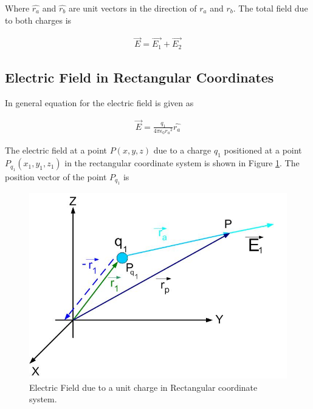 \documentclass{ximera}
\begin{document}
Where $\hat{r_a}$ and $\hat{r_b}$ are unit vectors in the direction of $r_a$ and $r_b$. The total field due to both charges is


\begin{eqnarray}
\vec{E}=\vec{E_1} + \vec{E_2} 
\end{eqnarray}






\subsection{Electric Field in Rectangular Coordinates}


In general equation for the electric field is given as



\begin{eqnarray}
\vec{E}=\frac{q_1}{4 \pi \epsilon_{0} {r_a}^2} \hat{r_a} \label{genfield}
\end{eqnarray}

The electric field at a point $P(x,y,z)$ due to a charge $q_1$ positioned at a point $P_{q_1}(x_1, y_1, z_1 )$  in the rectangular coordinate system is shown in Figure \ref{singlecharge}. The position vector of the point $P_{q_1}$  is 


\begin{figure}[htbp]
\begin{center}
\includegraphics[scale=0.5]{../jpg/singlechargecartcoord.jpg}
\end{center}
\caption{Electric Field due to a unit charge in Rectangular coordinate system.}
\label{singlecharge}
\end{figure}
\end{document}
